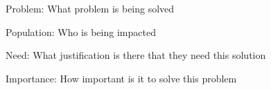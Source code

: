 Problem: What problem is being solved

Population: Who is being impacted

Need: What justification is there that they need this solution

Importance: How important is it to solve this problem

